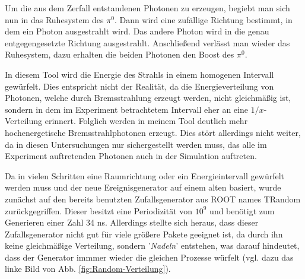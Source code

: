 \documentclass[a4paper,11pt,oneside,final,german,openbib,pdftex]{scrbook}
\begin{document}
{Um die aus dem Zerfall entstandenen Photonen zu erzeugen, begiebt man sich nun in das Ruhesystem des $\pi^0$. Dann wird eine zuf\"allige Richtung bestimmt, in dem ein Photon ausgestrahlt wird. Das andere Photon wird in die genau entgegengesetzte Richtung ausgestrahlt. Anschlie{\ss}end verl\"asst man wieder das Ruhesystem, dazu erhalten die beiden Photonen den Boost des $\pi^0$. 
\newline


In diesem Tool wird die Energie des Strahls in einem homogenen Intervall gew\"urfelt. Dies entspricht nicht der Realit\"at, da die Energieverteilung von Photonen, welche durch Bremsstrahlung erzeugt werden, nicht gleichm\"a{\ss}ig ist, sondern in dem im Experiment betrachtetem Intervall eher an eine $1/x$-Verteilung erinnert. Folglich werden in meinem Tool deutlich mehr hochenergetische Bremsstrahlphotonen erzeugt. Dies st\"ort allerdings nicht weiter, da in diesen Untersuchungen nur sichergestellt werden muss, das alle im Experiment auftretenden Photonen auch in der Simulation auftreten.

Da in vielen Schritten eine Raumrichtung oder ein Energieintervall gew\"urfelt werden muss und der neue Ereignisgenerator auf einem alten basiert, wurde zun\"achst auf den bereits benutzten Zufallsgenerator aus ROOT names TRandom zur\"uckgegriffen. Dieser besitzt eine Periodizit\"at von $10^9$ und ben\"otigt zum Generieren einer Zahl 34 ns. Allerdings stellte sich heraus, dass dieser Zufallsgenerator nicht gut f\"ur viele gr\"o{\ss}ere Pakete geeignet ist, da durch ihn keine gleichm\"a{\ss}ige Verteilung, sondern '\textit{Nadeln}' entstehen, was darauf hindeutet, dass der Generator immmer wieder die gleichen Prozesse w\"urfelt (vgl. dazu das linke Bild von Abb. \ref{fig:Random-Verteilung}). 



}
\end{document}
